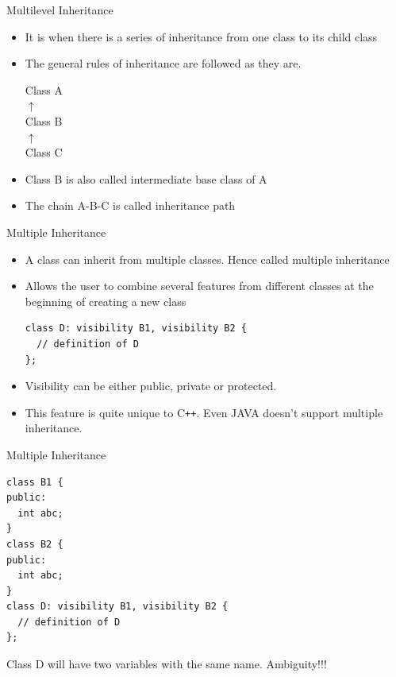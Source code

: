 \documentclass{beamer}
\begin{document}
\begin{frame}[fragile]{Multilevel Inheritance}
  \begin{itemize}
    \item It is when there is a series of inheritance from one class to its child class\pause
    \item The general rules of inheritance are followed as they are.\pause
      \begin{center}
        Class A\\ $\uparrow$\\ Class B\\ $\uparrow$\\ Class C
      \end{center}\pause
    \item Class B is also called intermediate base class of A\pause
    \item The chain A-B-C is called inheritance path
  \end{itemize}
\end{frame}

\begin{frame}[fragile]{Multiple Inheritance}
  \begin{itemize}
    \item A class can inherit from multiple classes. Hence called multiple inheritance\pause
    \item Allows the user to combine several features from different classes at the beginning of creating a new class\pause
      \begin{lstlisting}
class D: visibility B1, visibility B2 {
  // definition of D
};
      \end{lstlisting}\pause
    \item Visibility can be either public, private or protected.\pause
    \item This feature is quite unique to C\texttt{++}. Even JAVA doesn't support multiple inheritance.
  \end{itemize}
\end{frame}

\begin{frame}[fragile]{Multiple Inheritance}
  \begin{lstlisting}
class B1 {
public:
  int abc;
}
class B2 {
public:
  int abc;
}
class D: visibility B1, visibility B2 {
  // definition of D
};
  \end{lstlisting}\pause
  Class D will have two variables with the same name. Ambiguity!!!
\end{frame}
\end{document}
